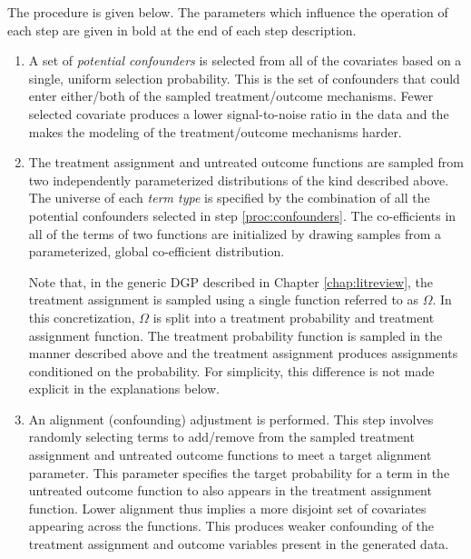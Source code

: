 \documentclass[../main.tex]{subfiles}
\begin{document}
\vspace{\baselineskip}

The procedure is given below. The parameters which influence the operation of each step are given in bold at the end of each step description.

\begin{enumerate}
    \item A set of \textit{potential confounders} is selected from all of the covariates based on a single, uniform selection probability. This is the set of confounders that could enter either/both of the sampled treatment/outcome mechanisms. Fewer selected covariate produces a lower signal-to-noise ratio in the data and the makes the modeling of the treatment/outcome mechanisms harder. \label{proc:confounders}

    \item The treatment assignment and untreated outcome functions are sampled from two independently parameterized distributions of the kind described above. The universe of each \textit{term type} is specified by the combination of all the potential confounders selected in step \ref{proc:confounders}. The co-efficients in all of the terms of two functions are initialized by drawing samples from a parameterized, global co-efficient distribution.

    \vspace{\baselineskip}

    Note that, in the generic DGP described in Chapter \ref{chap:litreview}, the treatment assignment is sampled using a single function referred to as $\Omega$. In this concretization, $\Omega$ is split into a treatment probability and treatment assignment function. The treatment probability function is sampled in the manner described above and the treatment assignment produces assignments conditioned on the probability. For simplicity, this difference is not made explicit in the explanations below.

    \item An alignment (confounding) adjustment is performed. This step involves randomly selecting terms to add/remove from the sampled treatment assignment and untreated outcome functions to meet a target alignment parameter. This parameter specifies the target probability for a term in the untreated outcome function to also appears in the treatment assignment function. Lower alignment thus implies a more disjoint set of covariates appearing across the functions. This produces weaker confounding of the treatment assignment and outcome variables present in the generated data.


\end{enumerate}
\end{document}
